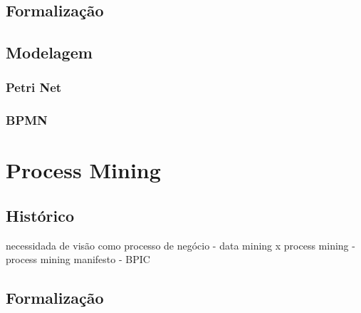 \documentclass[a4paper]{article}
\begin{document}
\lipsum[10]
\lipsum[10]
\lipsum[10]
\lipsum[10]
\lipsum[10]
\lipsum[10]

\subsection{Formalização}

\cite{PM_form}
\lipsum[10]
\lipsum[10]
\lipsum[10]
\lipsum[10]
\lipsum[10]
\lipsum[10]

\subsection{Modelagem}

\cite{PM_book}
\lipsum[10]
\lipsum[10]
\lipsum[10]
\lipsum[10]
\lipsum[10]
\lipsum[10]

\subsubsection{Petri Net}

\lipsum[10]
\lipsum[10]
\lipsum[10]
\lipsum[10]
\lipsum[10]
\lipsum[10]

\subsubsection{BPMN}

\lipsum[10]
\lipsum[10]
\lipsum[10]
\lipsum[10]
\lipsum[10]
\lipsum[10]

\section{Process Mining}

\cite{PM_book}
\lipsum[10]
\lipsum[10]
\lipsum[10]
\lipsum[10]
\lipsum[10]
\lipsum[10]

\subsection{Histórico}

necessidada de visão como processo de negócio - data mining x process mining - process mining manifesto - BPIC
\lipsum[10]
\lipsum[10]
\lipsum[10]
\lipsum[10]
\lipsum[10]
\lipsum[10]

\subsection{Formalização}
\end{document}
